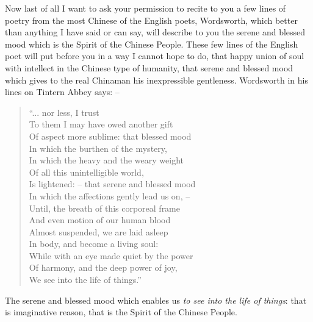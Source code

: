 Now last of all I want to ask your permission to recite to you a few lines of poetry from the most Chinese of the English poets, Wordsworth, which better than anything I have said or can say, will describe to you the serene and blessed mood which is the Spirit of the Chinese People. These few lines of the English poet will put before you in a way I cannot hope to do, that happy union of soul with intellect in the Chinese type of humanity, that serene and blessed mood which gives to the real Chinaman his inexpressible gentleness. Wordsworth in his lines on Tintern Abbey says: --
\begin{quote}
``... nor less, I trust \\
To them I may have owed another gift \\
Of aspect more sublime: that blessed mood \\
In which the burthen of the mystery, \\
In which the heavy and the weary weight \\
Of all this unintelligible world, \\
Is lightened: -- that serene and blessed mood \\
In which the affections gently lead us on,  -- \\
Until, the breath of this corporeal frame \\
And even motion of our human blood \\
Almost suspended, we are laid asleep \\
In body, and become a living soul: \\
While with an eye made quiet by the power \\
Of harmony, and the deep power of joy, \\
We see into the life of things.''
\end{quote}

The serene and blessed mood which enables us \emph{to see into the life of things}:
that is imaginative reason, that is the Spirit of the Chinese People.
